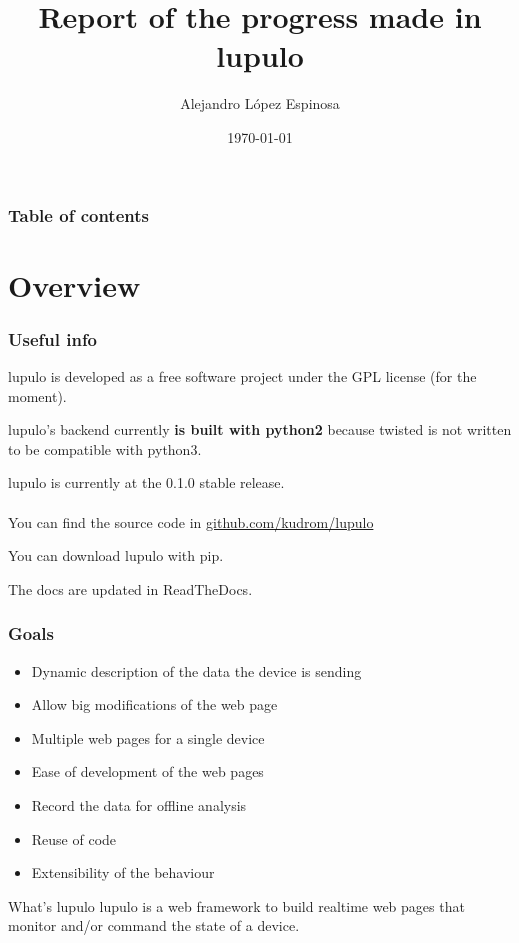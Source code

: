 \documentclass{beamer}
\title[Overview of lupulo]{Report of the progress made in \textbf{lupulo}}
\author{Alejandro López Espinosa}
\institute[VIVES university]
{
    VIVES University
    \medskip
}
\date{\today}
\begin{document}
    \begin{frame}
    \titlepage
    \end{frame}

    \begin{frame}
        \frametitle{Table of contents}
        \tableofcontents
    \end{frame}

    \section{Overview}
    \begin{frame}
        \frametitle{Useful info}
        lupulo is developed as a free software project under the GPL
        license (for the moment).

        lupulo's backend currently \textbf{is built with python2} because
        twisted is not written to be compatible with python3.

        lupulo is currently at the 0.1.0 stable release.
        \\~\\

        You can find the source code in 
        \textcolor{orange}{\href{http://github.com/kudrom/lupulo}{github.com/kudrom/lupulo}}

        You can download lupulo with pip.

        The docs are updated in ReadTheDocs.
    \end{frame}

    \begin{frame}
        \frametitle{Goals}
        \begin{itemize}
            \item Dynamic description of the data the device is sending
            \item Allow big modifications of the web page
            \item Multiple web pages for a single device
            \item Ease of development of the web pages
            \item Record the data for offline analysis
            \item Reuse of code
            \item Extensibility of the behaviour
        \end{itemize}
        \vspace{1cm}

        \begin{block}{What's lupulo}
            lupulo is a web framework to build realtime web pages that monitor
            and/or command the state of a device.
        \end{block}
    \end{frame}
\end{document}
